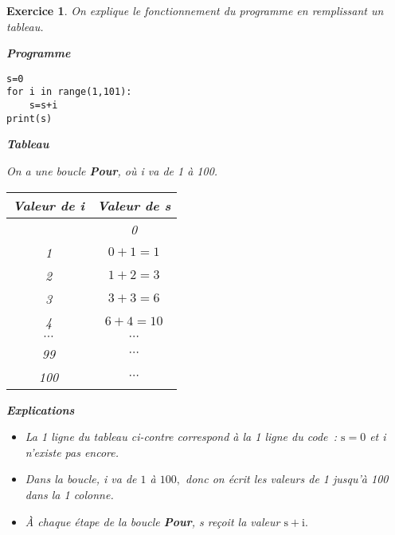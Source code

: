\documentclass[10pt]{article}
\newtheorem{exo}{Exercice}
\begin{document}
\begin{exo}

On explique le fonctionnement du programme en remplissant un tableau.


\setlength{\columnseprule}{1pt}

\begin{multicols}{3}

\begin{center}
\textbf{Programme}
\end{center}

\begin{lstlisting}
s=0
for i in range(1,101):
	s=s+i
print(s)
\end{lstlisting}



\vspace*{6cm}


\columnbreak

\begin{center}
\textbf{Tableau}
\end{center}


On a une boucle \textbf{Pour}, où i va de 1 à 100.

\medskip

\begin{center}


\begin{tabular}{|c|c|} \hline
\textbf{Valeur de i}& \textbf{Valeur de s}\\ \hline
\cellcolor{gray}& 0\\ \hline
1& $0+1=1$\\ \hline
2&$1+2=3$\\ \hline
3&$3+3=6$\\ \hline
4&$6+4=10$ \\ \hline
$\cdots$&$\cdots$\\ \hline
99&$\cdots$\\ \hline
100&$\cdots$\\ \hline
\end{tabular}
\end{center}
\vspace*{3.5cm}


\columnbreak

\begin{center}
\textbf{Explications}
\end{center}

\begin{itemize}
\item[\textbullet] La 1 ligne du tableau ci-contre correspond à la 1 ligne du code~: $\text{s}=0$ et i n'existe pas encore.
\item[\textbullet] Dans la boucle, i va de $1$ à $100,$ donc on écrit les valeurs de 1 jusqu'à 100 dans la 1 colonne.
\item[\textbullet] À chaque étape de la boucle \textbf{Pour}, s reçoit la valeur $\text{s}+\text{i}.$


\end{itemize}
\end{multicols}
\end{exo}
\end{document}

